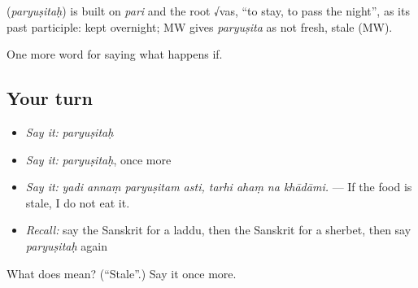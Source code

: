 \begin{cousinweb}
\textbf{} (\emph{paryuṣitaḥ}) is built on \emph{pari} and the root √vas, \textquotedblleft{}to stay, to pass the night\textquotedblright{}, as its past participle: kept overnight; MW gives \emph{paryuṣita} as not fresh, stale (MW).
\end{cousinweb}

\begin{grammarlens}[title={What you've built}]
One more word for saying what happens if.
\end{grammarlens}

\subsection*{Your turn}
\begin{itemize}
\raggedright
  \item \emph{Say it:} \emph{paryuṣitaḥ}
  \item \emph{Say it:} \emph{paryuṣitaḥ}, once more
  \item \emph{Say it:} \emph{yadi annaṃ paryuṣitam asti, tarhi ahaṃ na khādāmi.} — If the food is stale, I do not eat it.
  \item \emph{Recall:} say the Sanskrit for a laddu, then the Sanskrit for a sherbet, then say \emph{paryuṣitaḥ} again
\end{itemize}

\begin{tcolorbox}[breakable,colback=teal!4,colframe=teal!35!black,title={Before you move on}]
What does  mean? (\textquotedblleft{}Stale\textquotedblright{}.) Say it once more.
\end{tcolorbox}

